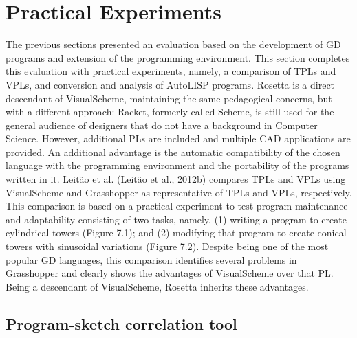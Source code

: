 
\chapter{Practical Experiments}
\label{chapter:experiments}

The previous sections presented an evaluation based on the development of GD programs and extension of the programming environment. This section completes this evaluation with practical experiments, namely, a comparison of TPLs and VPLs, and conversion and analysis of AutoLISP programs.
Rosetta is a direct descendant of VisualScheme, maintaining the same pedagogical concerns, but with
a different approach: Racket, formerly called Scheme, is still used for the general audience of designers
that do not have a background in Computer Science. However, additional PLs are included and multiple
CAD applications are provided. An additional advantage is the automatic compatibility of the chosen
language with the programming environment and the portability of the programs written in it.
Leitão et al. (Leitão et al., 2012b) compares TPLs and VPLs using VisualScheme and Grasshopper as
representative of TPLs and VPLs, respectively. This comparison is based on a practical experiment to test
program maintenance and adaptability consisting of two tasks, namely, (1) writing a program to create
cylindrical towers (Figure 7.1); and (2) modifying that program to create conical towers with sinusoidal
variations (Figure 7.2). Despite being one of the most popular GD languages, this comparison identifies
several problems in Grasshopper and clearly shows the advantages of VisualScheme over that PL. Being a
descendant of VisualScheme, Rosetta inherits these advantages.

\section{Program-sketch correlation tool}

